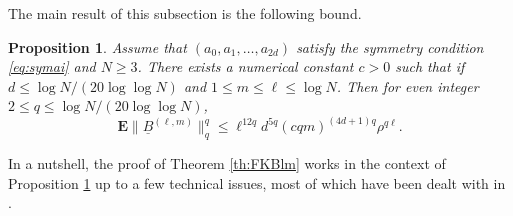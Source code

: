 \documentclass[11pt]{article}
\newtheorem{proposition}[lemma]{Proposition}
\newcommand{\dE}{\mathbf {E}}
\newcommand{\1}{1\!\!{\sf I}}
\begin{document}
The main result of this subsection is the following bound.

\begin{proposition}\label{prop:FBB}
Assume that $(a_0,a_1,\ldots,a_{2d})$ satisfy  the symmetry condition \eqref{eq:symai} and $N \geq 3$. There exists a numerical constant $c > 0$ such that if $d \leq \log N / (20 \log \log N)$ and $1 \leq m \leq \ell \leq  \log N$. Then for even integer $2 \leq q \leq \log N / (20 \log \log N)$, 
$$
\dE \| \underline B^{(\ell,m)} \|_{q}^{q} \leq   \ell^{12q}   d^{5q}  ( c qm)^{(4d +1)q} \rho^{q \ell}.
$$ 
\end{proposition}

In a nutshell, the proof of Theorem \ref{th:FKBlm} works in the context of Proposition \ref{prop:FBB} up to a few technical issues, most of which have been dealt with in \cite{MR4203039,MR4024563}. 
\end{document}
